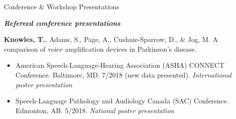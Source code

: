 \documentclass{resume} %
\begin{document}
\begin{rSection}{Conference \& Workshop Presentations}

\begin{center}
	{\bf \emph{Refereed conference presentations}}
\end{center}
	
	{\bf Knowles, T.}, Adams, S., Page, A., Cushnie-Sparrow, D., \& Jog, M. A comparison of voice amplification devices in Parkinson's disease. 
		\begin{itemize}
			\renewcommand\labelitemi{$\cdot$}
			\item American Speech-Language-Hearing Association (ASHA) CONNECT Conference. Baltimore, MD. 7/2018 (new data presented). \emph{International poster presentation}
			\item Speech-Language Pathology and Audiology Canada (SAC) Conference. Edmonton, AB. 5/2018. \emph{National poster presentation}
		\end{itemize}
	

	
	

\end{rSection}
\end{document}
